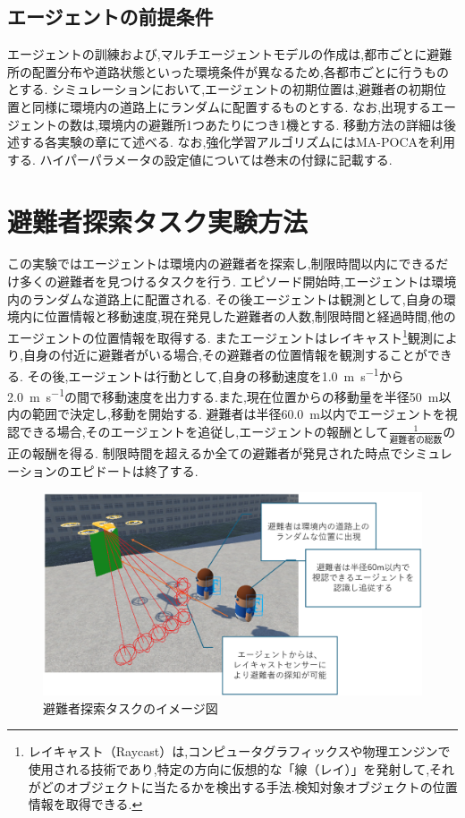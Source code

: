 \subsection{エージェントの前提条件}
エージェントの訓練および,マルチエージェントモデルの作成は,都市ごとに避難所の配置分布や道路状態といった環境条件が異なるため,各都市ごとに行うものとする.
シミュレーションにおいて,エージェントの初期位置は,避難者の初期位置と同様に環境内の道路上にランダムに配置するものとする.
なお,出現するエージェントの数は,環境内の避難所1つあたりにつき1機とする.
移動方法の詳細は後述する各実験の章にて述べる.
なお,強化学習アルゴリズムにはMA-POCAを利用する.
ハイパーパラメータの設定値については巻末の付録に記載する.

\section{避難者探索タスク実験方法}
この実験ではエージェントは環境内の避難者を探索し,制限時間以内にできるだけ多くの避難者を見つけるタスクを行う.
エピソード開始時,エージェントは環境内のランダムな道路上に配置される.
その後エージェントは観測として,自身の環境内に位置情報と移動速度,現在発見した避難者の人数,制限時間と経過時間,他のエージェントの位置情報を取得する.
またエージェントはレイキャスト\footnote{レイキャスト（Raycast）は,コンピュータグラフィックスや物理エンジンで使用される技術であり,特定の方向に仮想的な「線（レイ）」を発射して,それがどのオブジェクトに当たるかを検出する手法.検知対象オブジェクトの位置情報を取得できる.}観測により,自身の付近に避難者がいる場合,その避難者の位置情報を観測することができる.
その後,エージェントは行動として,自身の移動速度を\SI{1.0}{\meter\per\second}から\SI{2.0}{\meter\per\second}の間で移動速度を出力する.また,現在位置からの移動量を半径\SI{50}{\meter}以内の範囲で決定し,移動を開始する.
避難者は半径\SI{60.0}{\meter}以内でエージェントを視認できる場合,そのエージェントを追従し,エージェントの報酬として$\frac{1}{避難者の総数}$の正の報酬を得る.
制限時間を超えるか全ての避難者が発見された時点でシミュレーションのエピドートは終了する.
\begin{figure}[H] 
  \centering 
  \includegraphics[width=1.0\textwidth]{Figures/SearchEx.png}
  \caption{避難者探索タスクのイメージ図} 
  \label{fig:01} 
\end{figure}
